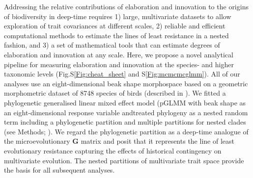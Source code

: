 \documentclass[12pt,letterpaper]{article}
\begin{document}
Addressing the relative contributions of elaboration and innovation to the origins of biodiversity in deep-time requires
1) large, multivariate datasets to allow exploration of trait covariances at different scales,
2) reliable and efficient computational methods to estimate the lines of least resistance in a nested fashion,
and 3) a set of mathematical tools that can estimate degrees of elaboration and innovation at any scale.
Here, we propose a novel analytical pipeline for measuring elaboration and innovation at the species- and higher taxonomic levels (Fig.S\ref{Fig:cheat_sheet} and S\ref{Fig:mcmcmcglmm}).
All of our analyses use an eight-dimensional beak shape morphospace based on a geometric morphometric dataset of 8748 species of birds (described in \cite{hughes2022global}).
We fitted a phylogenetic generalised linear mixed effect model (pGLMM with beak shape as an eight-dimensional response variable andtreated phylogeny as a nested random term including a phylogenetic partition and multiple partitions for nested clades (see Methods; \cite{MCMCglmm}).
We regard the phylogenetic partition as a deep-time analogue of the microevolutionary \textbf{G} matrix and posit that it represents the line of least evolutionary resistance capturing the effects of historical contingency on multivariate evolution.
The nested partitions of multivariate trait space provide the basis for all subsequent analyses.
\end{document}
